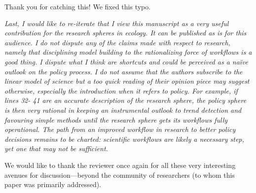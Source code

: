 \documentclass[11pt,letter]{article}
\begin{document}
Thank you for catching this! We fixed this typo.

\begin{mybox}
\emph{Last, I would like to re-iterate that I view this manuscript as a very useful contribution for the
research spheres in ecology. It can be published as is for this audience. I do not dispute any of
the claims made with respect to research, namely that disciplining model building to the
rationalizing force of workflows is a good thing. I dispute what I think are shortcuts and could
be perceived as a naïve outlook on the policy process. I do not assume that the authors
subscribe to the linear model of science but a too quick reading of their opinion piece may
suggest otherwise, especially the introduction when it refers to policy. For example, if lines 32-
41 are an accurate description of the research sphere, the policy sphere is then very rational in
keeping an instrumental outlook to trend detection and favouring simple methods until the
research sphere gets its workflows fully operational. The path from an improved workflow in
research to better policy decisions remains to be charted: scientific workflows are likely a
necessary step, yet one that may not be sufficient.}
\end{mybox}

We would like to thank the reviewer once again for all these very interesting avenues for discussion---beyond the community of researchers (to whom this paper was primarily addressed).
\end{document}
